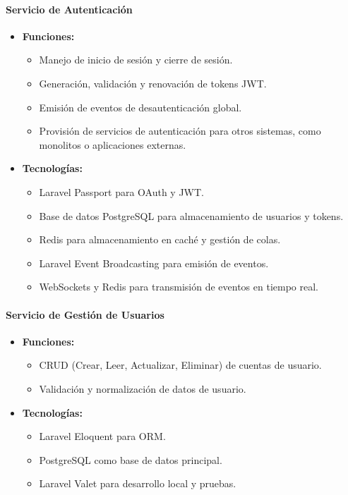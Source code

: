 \documentclass{article}
\begin{document}
\paragraph{Servicio de Autenticación}
\begin{itemize}
    \item \textbf{Funciones:}
          \begin{itemize}
              \item Manejo de inicio de sesión y cierre de sesión.
              \item Generación, validación y renovación de tokens JWT.
              \item Emisión de eventos de desautenticación global.
              \item Provisión de servicios de autenticación para otros sistemas, como monolitos o aplicaciones externas.
          \end{itemize}
    \item \textbf{Tecnologías:}
          \begin{itemize}
              \item Laravel Passport para OAuth y JWT.
              \item Base de datos PostgreSQL para almacenamiento de usuarios y tokens.
              \item Redis para almacenamiento en caché y gestión de colas.
              \item Laravel Event Broadcasting para emisión de eventos.
              \item WebSockets y Redis para transmisión de eventos en tiempo real.
          \end{itemize}
\end{itemize}

\paragraph{Servicio de Gestión de Usuarios}
\begin{itemize}
    \item \textbf{Funciones:}
          \begin{itemize}
              \item CRUD (Crear, Leer, Actualizar, Eliminar) de cuentas de usuario.
              \item Validación y normalización de datos de usuario.
          \end{itemize}
    \item \textbf{Tecnologías:}
          \begin{itemize}
              \item Laravel Eloquent para ORM.
              \item PostgreSQL como base de datos principal.
              \item Laravel Valet para desarrollo local y pruebas.
          \end{itemize}
\end{itemize}
\end{document}
